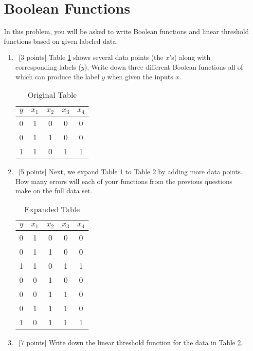 \section{Boolean Functions}
\label{sec:bool_func}

In this problem, you will be asked to write Boolean functions and
linear threshold functions based on given labeled data.

\begin{enumerate}

\item ~[3 points] Table \ref{t1} shows several data points (the $x$'s)
  along with corresponding labels ($y$). Write down three different
  Boolean functions all of which can produce the label $y$ when given
  the inputs $x$.

  \begin{table}[h]
    \centering
    \begin{tabular}{|c|cccc|}
      \hline
      $y$  & $x_1$ & $x_2$  & $x_3$  & $x_4$  \\
      \hline
      0  &  1    &  0     &  0     &  0     \\
      0  &  1    &  1     &  0     &  0     \\
      1  &  1    &  0     &  1     &  1     \\
      \hline
    \end{tabular}
    \caption{Original Table}
    \label{t1}
  \end{table}

\item ~[5 points] Next, we expand Table \ref{t1} to Table \ref{t2} by
  adding more data points. How many errors will each of your functions
  from the previous questions make on the full data set.
  
  \begin{table}[h]
    \centering
    \begin{tabular}{|c|cccc|}
      \hline
      $y$  & $x_1$ & $x_2$  & $x_3$  & $x_4$  \\
      \hline
      0  &  1    &  0     &  0     &  0     \\
      0  &  1    &  1     &  0     &  0     \\
      1  &  1    &  0     &  1     &  1     \\
      0  &  0    &  1     &  0     &  0     \\
      0  &  0    &  1     &  1     &  0     \\
      0  &  1    &  1     &  1     &  0     \\
      1  &  0    &  1     &  1     &  1     \\
      \hline
    \end{tabular}
    \caption{Expanded Table}
    \label{t2}
  \end{table}
 
 
\item ~[7 points] Write down the linear threshold function for the
  data in Table \ref{t2}.

\end{enumerate}


